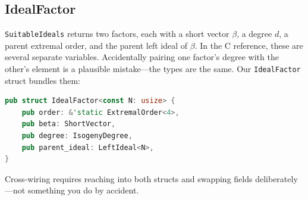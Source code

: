 \subsection{IdealFactor}

\texttt{SuitableIdeals} returns two factors, each with a short
vector $\beta$, a degree $d$, a parent extremal order, and the
parent left ideal of $\beta$.  In the C reference, these are
several separate variables.  Accidentally pairing one factor's
degree with the other's element is a plausible mistake---the types
are the same.  Our \texttt{IdealFactor} struct bundles them:
\begin{lstlisting}[language=Rust]
pub struct IdealFactor<const N: usize> {
    pub order: &'static ExtremalOrder<4>,
    pub beta: ShortVector,
    pub degree: IsogenyDegree,
    pub parent_ideal: LeftIdeal<N>,
}
\end{lstlisting}
Cross-wiring requires reaching into both structs and swapping fields
deliberately---not something you do by accident.
